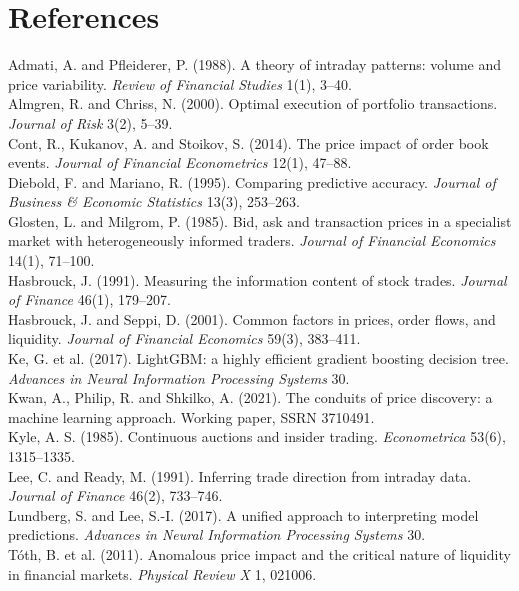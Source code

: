 \documentclass[10pt,letterpaper]{article}
\begin{document}
\section*{References}
\footnotesize
\setlength{\parskip}{1pt}
Admati, A. and Pfleiderer, P. (1988). A theory of intraday patterns: volume and price variability. \emph{Review of Financial Studies} 1(1), 3--40.\\
Almgren, R. and Chriss, N. (2000). Optimal execution of portfolio transactions. \emph{Journal of Risk} 3(2), 5--39.\\
Cont, R., Kukanov, A. and Stoikov, S. (2014). The price impact of order book events. \emph{Journal of Financial Econometrics} 12(1), 47--88.\\
Diebold, F. and Mariano, R. (1995). Comparing predictive accuracy. \emph{Journal of Business \& Economic Statistics} 13(3), 253--263.\\
Glosten, L. and Milgrom, P. (1985). Bid, ask and transaction prices in a specialist market with heterogeneously informed traders. \emph{Journal of Financial Economics} 14(1), 71--100.\\
Hasbrouck, J. (1991). Measuring the information content of stock trades. \emph{Journal of Finance} 46(1), 179--207.\\
Hasbrouck, J. and Seppi, D. (2001). Common factors in prices, order flows, and liquidity. \emph{Journal of Financial Economics} 59(3), 383--411.\\
Ke, G. et al. (2017). LightGBM: a highly efficient gradient boosting decision tree. \emph{Advances in Neural Information Processing Systems} 30.\\
Kwan, A., Philip, R. and Shkilko, A. (2021). The conduits of price discovery: a machine learning approach. Working paper, SSRN 3710491.\\
Kyle, A. S. (1985). Continuous auctions and insider trading. \emph{Econometrica} 53(6), 1315--1335.\\
Lee, C. and Ready, M. (1991). Inferring trade direction from intraday data. \emph{Journal of Finance} 46(2), 733--746.\\
Lundberg, S. and Lee, S.-I. (2017). A unified approach to interpreting model predictions. \emph{Advances in Neural Information Processing Systems} 30.\\
T\'oth, B. et al. (2011). Anomalous price impact and the critical nature of liquidity in financial markets. \emph{Physical Review X} 1, 021006.
\end{document}
